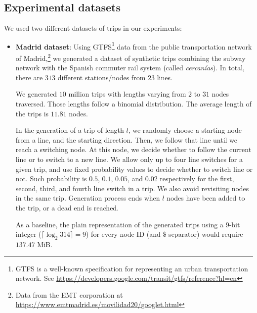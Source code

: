 \subsection{Experimental datasets}
\label{sec:ed}
We used two different datasets of trips in our experiments:
\begin{itemize}
  \item {\bf Madrid dataset}:
  Using GTFS\footnote{GTFS is a well-known specification for representing an urban transportation network. See
  \url{https://developers.google.com/transit/gtfs/reference?hl=en}} data from the  public transportation network of 
  {Madrid},\footnote{Data from
  the EMT corporation at \url{https://www.emtmadrid.es/movilidad20/googlet.html}} we generated a dataset of 
  synthetic trips combining the subway network with the Spanish commuter rail system (called {\em cercanías}).
  In total, there are $313$ different stations/nodes from $23$ lines.
 
We generated $10$ million trips with lengths varying from $2$ to $31$ nodes traversed. Those lengths follow a binomial 
distribution. The average length of the trips is $11.81$ nodes. 
%

In the generation of a trip of length $l$, we randomly choose a starting node from a line, and the starting direction. 
Then, we follow that line until we reach a switching node. At this node, we decide whether to follow the current 
line or to switch to a new line. We allow only up to four line switches for a given trip, and use fixed probability 
values to decide whether to switch line or not. Such probability is $0.5$, $0.1$, $0.05$, and $0.02$ respectively 
for the first, second, third, and fourth line switch in a trip. 
We also avoid revisiting nodes in the same trip. 
Generation process ends when $l$ nodes have been added to the trip, or a dead end is reached.

As a baseline, the plain representation of the generated trips using a $9$-bit integer ($\lceil\log_2 314\rceil= 9$) 
for every node-ID (and $\$$ separator) would require $137.47$ MiB.


\end{itemize}
